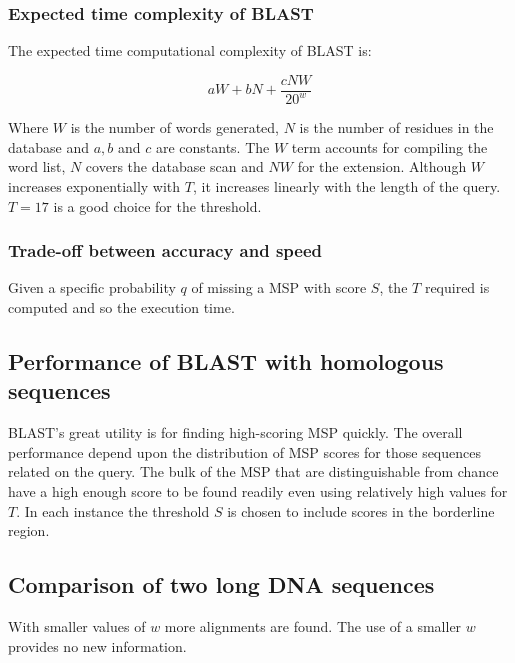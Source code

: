 		\subsubsection{Expected time complexity of BLAST}
		The expected time computational complexity of BLAST is:

		$$aW + bN + \frac{cNW}{20^w}$$

		Where $W$ is the number of words generated, $N$ is the number of residues in the database and $a, b$ and $c$ are constants.
		The $W$ term accounts for compiling the word list, $N$ covers the database scan and $NW$ for the extension.
		Although $W$ increases exponentially with $T$, it increases linearly with the length of the query.
		$T=17$ is a good choice for the threshold.

		\subsubsection{Trade-off between accuracy and speed}
		Given a specific probability $q$ of missing a MSP with score $S$, the $T$ required is computed and so the execution time.

	\subsection{Performance of BLAST with homologous sequences}
	BLAST's great utility is for finding high-scoring MSP quickly.
	The overall performance depend upon the distribution of MSP scores for those sequences related on the query.
	The bulk of the MSP that are distinguishable from chance have a high enough score to be found readily even using relatively high values for $T$.
	In each instance the threshold $S$ is chosen to include scores in the borderline region.

	\subsection{Comparison of two long DNA sequences}
	With smaller values of $w$ more alignments are found.
	The use of a smaller $w$ provides no new information.
